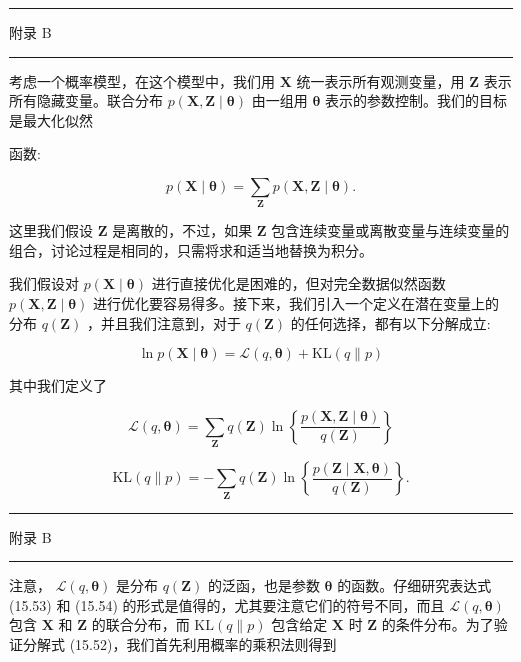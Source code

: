 \documentclass[10pt]{article}
\newcommand{\HRule}{\begin{center}\rule{0.9\linewidth}{0.2mm}\end{center}}
\begin{document}
\HRule

附录 B

\HRule

考虑一个概率模型，在这个模型中，我们用 \(\mathbf{X}\) 统一表示所有观测变量，用 \(\mathbf{Z}\) 表示所有隐藏变量。联合分布 \(p\left( {\mathbf{X},\mathbf{Z} \mid  \mathbf{\theta }}\right)\) 由一组用 \(\mathbf{\theta }\) 表示的参数控制。我们的目标是最大化似然

函数:

\[
p\left( {\mathbf{X} \mid  \mathbf{\theta }}\right)  = \mathop{\sum }\limits_{\mathbf{Z}}p\left( {\mathbf{X},\mathbf{Z} \mid  \mathbf{\theta }}\right) . \tag{15.51}
\]

这里我们假设 \(\mathbf{Z}\) 是离散的，不过，如果 \(\mathbf{Z}\) 包含连续变量或离散变量与连续变量的组合，讨论过程是相同的，只需将求和适当地替换为积分。

我们假设对 \(p\left( {\mathbf{X} \mid  \mathbf{\theta }}\right)\) 进行直接优化是困难的，但对完全数据似然函数 \(p\left( {\mathbf{X},\mathbf{Z} \mid  \mathbf{\theta }}\right)\) 进行优化要容易得多。接下来，我们引入一个定义在潜在变量上的分布 \(q\left( \mathbf{Z}\right)\) ，并且我们注意到，对于 \(q\left( \mathbf{Z}\right)\) 的任何选择，都有以下分解成立:

\[
\ln p\left( {\mathbf{X} \mid  \mathbf{\theta }}\right)  = \mathcal{L}\left( {q,\mathbf{\theta }}\right)  + \mathrm{{KL}}\left( {q\parallel p}\right)  \tag{15.52}
\]

其中我们定义了

\[
\mathcal{L}\left( {q,\mathbf{\theta }}\right)  = \mathop{\sum }\limits_{\mathbf{Z}}q\left( \mathbf{Z}\right) \ln \left\{  \frac{p\left( {\mathbf{X},\mathbf{Z} \mid  \mathbf{\theta }}\right) }{q\left( \mathbf{Z}\right) }\right\}   \tag{15.53}
\]

\[
\mathrm{{KL}}\left( {q\parallel p}\right)  =  - \mathop{\sum }\limits_{\mathbf{Z}}q\left( \mathbf{Z}\right) \ln \left\{  \frac{p\left( {\mathbf{Z} \mid  \mathbf{X},\mathbf{\theta }}\right) }{q\left( \mathbf{Z}\right) }\right\}  . \tag{15.54}
\]

\HRule

附录 B

\HRule

注意， \(\mathcal{L}\left( {q,\mathbf{\theta }}\right)\) 是分布 \(q\left( \mathbf{Z}\right)\) 的泛函，也是参数 \(\mathbf{\theta }\) 的函数。仔细研究表达式 (15.53) 和 (15.54) 的形式是值得的，尤其要注意它们的符号不同，而且 \(\mathcal{L}\left( {q,\mathbf{\theta }}\right)\) 包含 \(\mathbf{X}\) 和 \(\mathbf{Z}\) 的联合分布，而 \(\mathrm{{KL}}\left( {q\parallel p}\right)\) 包含给定 \(\mathbf{X}\) 时 \(\mathbf{Z}\) 的条件分布。为了验证分解式 (15.52)，我们首先利用概率的乘积法则得到
\end{document}
